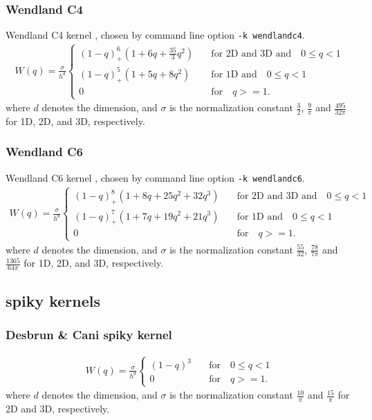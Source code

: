 \documentclass[10pt,fleqn,twoside]{article}
\begin{document}
\subsubsection{Wendland C4}
Wendland C4 kernel \citep{2012MNRAS.425.1068D}, chosen by command line option \texttt{-k
 wendlandc4}.
\begin{align}
 W(q) = \frac{\sigma}{h^d} \left\{
 \begin{array}{ll}
  (1-q)_+^6 (1+6q+\frac{35}{3}q^2) & \quad \mbox{for 2D and 3D and} \quad 0 \leq  q < 1 \\
  (1-q)_+^5 (1+5q+8q^2)            & \quad \mbox{for 1D and} \quad 0 \leq  q < 1        \\
  0                                & \quad \mbox{for} \quad q >= 1.
 \end{array}
 \right.
\end{align}
where $d$ denotes the dimension, and $\sigma$ is the normalization constant $\frac{3}{2}$,
$\frac{9}{\pi}$ and $\frac{495}{32\pi}$ for 1D, 2D, and 3D, respectively.
\subsubsection{Wendland C6}
Wendland C6 kernel \citep{2012MNRAS.425.1068D}, chosen by command line option \texttt{-k
 wendlandc6}.
\begin{align}
 W(q) = \frac{\sigma}{h^d} \left\{
 \begin{array}{ll}
  (1-q)_+^8 (1+8q+25q^2+32q^3) & \quad \mbox{for 2D and 3D and} \quad 0 \leq  q < 1 \\
  (1-q)_+^7 (1+7q+19q^2+21q^3) & \quad \mbox{for 1D and} \quad 0 \leq  q < 1        \\
  0                            & \quad \mbox{for} \quad q >= 1.
 \end{array}
 \right.
\end{align}
where $d$ denotes the dimension, and $\sigma$ is the normalization constant $\frac{55}{32}$,
$\frac{78}{7\pi}$ and $\frac{1365}{64\pi}$ for 1D, 2D, and 3D, respectively.

\subsection{spiky kernels}
\subsubsection{Desbrun \& Cani spiky kernel}
\begin{align}
 W(q) = \frac{\sigma}{h^d} \left\{
 \begin{array}{ll}
  (1-q)^3 & \quad \mbox{for} \quad 0 \leq  q < 1 \\
  0       & \quad \mbox{for} \quad q >= 1.
 \end{array}
 \right.
\end{align}
where $d$ denotes the dimension, and $\sigma$ is the normalization constant
$\frac{10}{\pi}$ and $\frac{15}{\pi}$ for 2D and 3D, respectively.



\end{document}
